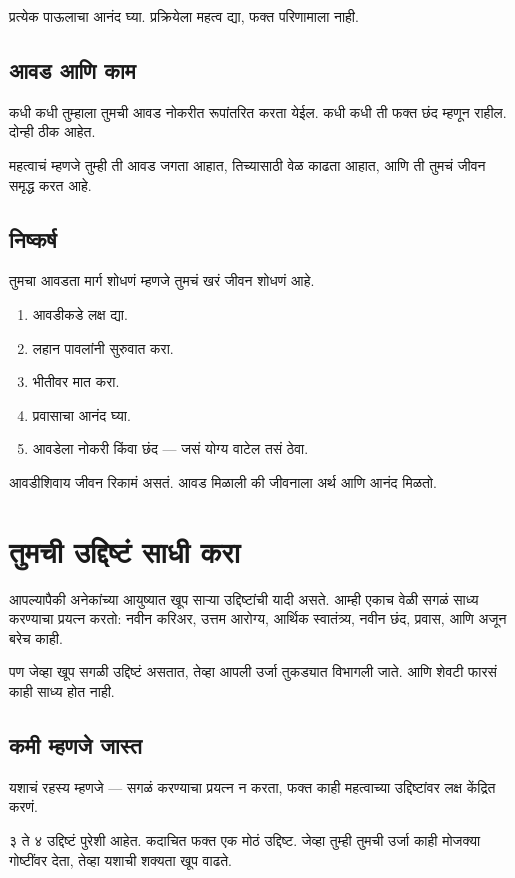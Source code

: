 प्रत्येक पाऊलाचा आनंद घ्या.  
प्रक्रियेला महत्व द्या,  
फक्त परिणामाला नाही.  

\section*{आवड आणि काम}
कधी कधी तुम्हाला तुमची आवड नोकरीत रूपांतरित करता येईल.  
कधी कधी ती फक्त छंद म्हणून राहील.  
दोन्ही ठीक आहेत.  

महत्वाचं म्हणजे तुम्ही ती आवड जगता आहात,  
तिच्यासाठी वेळ काढता आहात,  
आणि ती तुमचं जीवन समृद्ध करत आहे.  

\section*{निष्कर्ष}
तुमचा आवडता मार्ग शोधणं म्हणजे  
तुमचं खरं जीवन शोधणं आहे.  

\begin{enumerate}
\item आवडीकडे लक्ष द्या.  
\item लहान पावलांनी सुरुवात करा.  
\item भीतीवर मात करा.  
\item प्रवासाचा आनंद घ्या.  
\item आवडेला नोकरी किंवा छंद — जसं योग्य वाटेल तसं ठेवा.  
\end{enumerate}

आवडीशिवाय जीवन रिकामं असतं.  
आवड मिळाली की जीवनाला अर्थ आणि आनंद मिळतो.  


\chapter{तुमची उद्दिष्टं साधी करा}

आपल्यापैकी अनेकांच्या आयुष्यात खूप साऱ्या उद्दिष्टांची यादी असते.  
आम्ही एकाच वेळी सगळं साध्य करण्याचा प्रयत्न करतो:  
नवीन करिअर, उत्तम आरोग्य, आर्थिक स्वातंत्र्य,  
नवीन छंद, प्रवास, आणि अजून बरेच काही.  

पण जेव्हा खूप सगळी उद्दिष्टं असतात,  
तेव्हा आपली उर्जा तुकड्यात विभागली जाते.  
आणि शेवटी फारसं काही साध्य होत नाही.  

\section*{कमी म्हणजे जास्त}
यशाचं रहस्य म्हणजे —  
सगळं करण्याचा प्रयत्न न करता,  
फक्त काही महत्वाच्या उद्दिष्टांवर लक्ष केंद्रित करणं.  

३ ते ४ उद्दिष्टं पुरेशी आहेत.  
कदाचित फक्त एक मोठं उद्दिष्ट.  
जेव्हा तुम्ही तुमची उर्जा काही मोजक्या गोष्टींवर देता,  
तेव्हा यशाची शक्यता खूप वाढते.  

